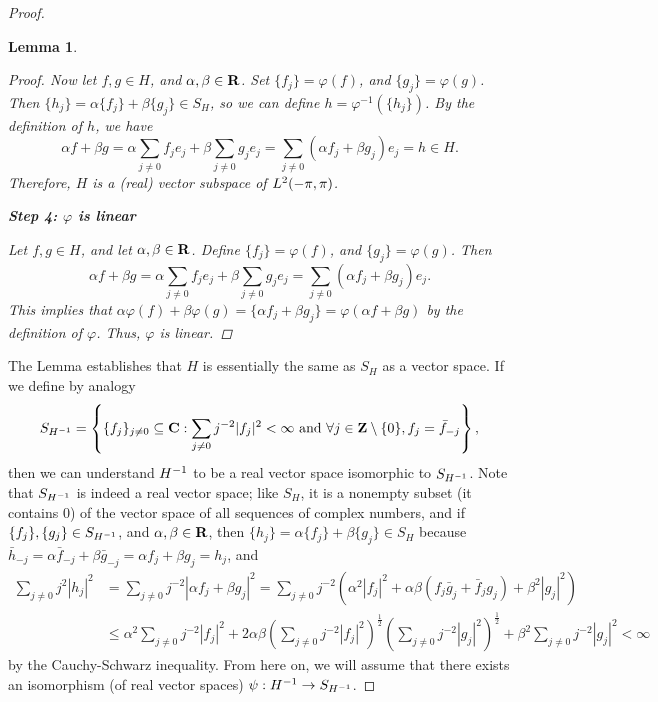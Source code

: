 \documentclass{homework}
\newtheorem{lemma}{Lemma}
\begin{document}
\begin{arabicparts}
\begin{proof}
\begin{lemma}
\begin{proof}
			Now let $f,g \in H$, and $\alpha,\beta\in\textbf{R}$. Set $\{f_j\} = \varphi(f)$, and $\{g_j\} = \varphi(g)$. Then $\{h_j\} = \alpha\{f_j\} + \beta\{g_j\}\in S_H$, so we can define $h =\varphi^{-1}(\{h_j\})$. By the definition of $h$, we have
			\begin{equation}
				\alpha f + \beta g = \alpha \sum_{j\ne 0}f_je_j + \beta\sum_{j\ne 0}g_je_j = \sum_{j\ne 0}(\alpha f_j + \beta g_j)e_j = h \in H.
			\end{equation}
			Therefore, $H$ is a (real) vector subspace of $L^2(-\pi,\pi)$.
			
			\textbf{Step 4: $\varphi$ is linear}
			
			Let $f,g\in H$, and let $\alpha,\beta\in \textbf{R}$. Define $\{f_j\} = \varphi(f)$, and $\{g_j\} = \varphi(g)$. Then
			\begin{equation}
				\alpha f + \beta g = \alpha \sum_{j\ne 0}f_je_j + \beta\sum_{j\ne0}g_je_j = \sum_{j\ne0}(\alpha f_j + \beta g_j)e_j.
			\end{equation}
			This implies that $\alpha\varphi(f) + \beta\varphi(g) = \{\alpha f_j + \beta g_j\} = \varphi(\alpha f + \beta g)$ by the definition of $\varphi$. Thus, $\varphi$ is linear.
		\end{proof}
		\end{lemma}
		The Lemma establishes that $H$ is essentially the same as $S_H$ as a vector space. If we define by analogy
		\begin{equation}
			S_{H^{-1}} = \left\{\{f_j\}_{j\ne0}\subseteq \textbf{C} : \sum_{j\ne0}j^{-2}|f_j|^2 < \infty \text{ and } \forall j\in\textbf{Z}\setminus\{0\}, f_j = \bar{f}_{-j}\right\},
		\end{equation}
		then we can understand ${H^{-1}}$ to be a real vector space isomorphic to $S_{H^{-1}}$. Note that $S_{H^{-1}}$ is indeed a real vector space; like $S_H$, it is a nonempty subset (it contains 0) of the vector space of all sequences of complex numbers, and if $\{f_j\}, \{g_j\} \in S_{H^{-1}}$, and $\alpha,\beta\in\textbf{R}$, then $\{h_j\} = \alpha\{f_j\} + \beta\{g_j\} \in S_H$ because $\bar{h}_{-j} = \alpha\bar{f}_{-j} + \beta\bar{g}_{-j} = \alpha f_j + \beta g_j = h_j$, and
		\begin{align}
			\sum_{j\ne 0}j^2|h_j|^2 &= \sum_{j\ne0}j^{-2}|\alpha f_j +\beta g_j|^2 = \sum_{j\ne 0}j^{-2}(\alpha^2|f_j|^2 + \alpha\beta(f_j\bar{g}_j + \bar{f}_jg_j) +\beta^2|g_j|^2)\\
			&\le \alpha^2\sum_{j\ne 0}j^{-2}|f_j|^2 + 2\alpha\beta\left(\sum_{j\ne0}j^{-2}|f_j|^2\right)^\frac{1}{2}\left(\sum_{j\ne0}j^{-2}|g_j|^2\right)^\frac{1}{2} + \beta^2\sum_{j\ne0}j^{-2}|g_j|^2 < \infty
		\end{align}
		by the Cauchy-Schwarz inequality. From here on, we will assume that there exists an isomorphism (of real vector spaces) $\psi: {H^{-1}} \to S_{H^{-1}}$.
		

\end{proof}
\end{arabicparts}
\end{document}
